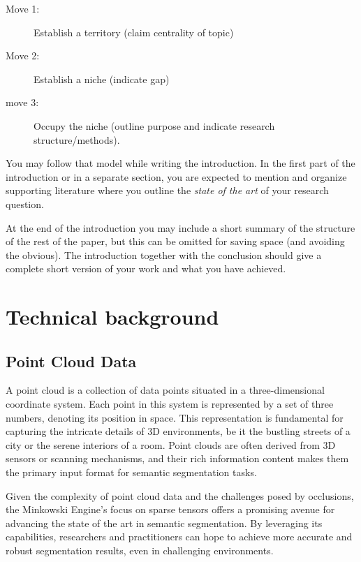 \documentclass[11pt, a4paper,oneside,chapterprefix=false]{scrbook}
\begin{document}
\begin{description}
\item[Move 1:] Establish a territory (claim centrality of topic)
\item[Move 2:] Establish a niche (indicate gap)
\item[move 3:] Occupy the niche (outline purpose and indicate research structure/methods).
\end{description}

You may follow that model while writing the introduction. In the first part of the introduction or in a separate section, you are expected to mention and organize supporting literature where you outline the \emph{state of the art} of your research question.

At the end of the introduction you may include a short summary of the structure of the rest of the paper, but this can be omitted for saving space (and avoiding the obvious). The introduction together with the conclusion should give a complete short version of your work and what you have achieved.

\section{Technical background}
\subsection{Point Cloud Data}

A point cloud is a collection of data points situated in a three-dimensional coordinate system. Each point in this system is represented by a set of three numbers, denoting its position in space. This representation is fundamental for capturing the intricate details of 3D environments, be it the bustling streets of a city or the serene interiors of a room. Point clouds are often derived from 3D sensors or scanning mechanisms, and their rich information content makes them the primary input format for semantic segmentation tasks.

Given the complexity of point cloud data and the challenges posed by occlusions, the Minkowski Engine's focus on sparse tensors offers a promising avenue for advancing the state of the art in semantic segmentation. By leveraging its capabilities, researchers and practitioners can hope to achieve more accurate and robust segmentation results, even in challenging environments.
\end{document}
